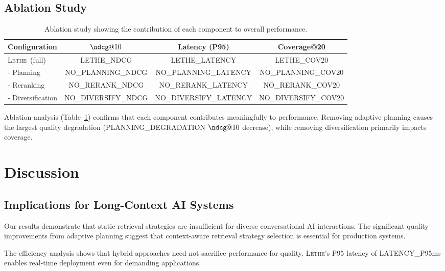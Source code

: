 \documentclass[letterpaper]{article}
\newcommand{\lethe}{\textsc{Lethe}}
\begin{document}
\subsection{Ablation Study}

\begin{table}[t]
\centering
\begin{tabular}{lccc}
\toprule
Configuration & $\ndcg@10$ & Latency (P95) & Coverage@20 \\
\midrule
\lethe\ (full) & {{LETHE_NDCG}} & {{LETHE_LATENCY}} & {{LETHE_COV20}} \\
- Planning & {{NO_PLANNING_NDCG}} & {{NO_PLANNING_LATENCY}} & {{NO_PLANNING_COV20}} \\
- Reranking & {{NO_RERANK_NDCG}} & {{NO_RERANK_LATENCY}} & {{NO_RERANK_COV20}} \\
- Diversification & {{NO_DIVERSIFY_NDCG}} & {{NO_DIVERSIFY_LATENCY}} & {{NO_DIVERSIFY_COV20}} \\
\bottomrule
\end{tabular}
\caption{Ablation study showing the contribution of each component to overall performance.}
\label{tab:ablation}
\end{table}

Ablation analysis (Table~\ref{tab:ablation}) confirms that each component contributes meaningfully to performance. Removing adaptive planning causes the largest quality degradation ({{PLANNING_DEGRADATION}} $\ndcg@10$ decrease), while removing diversification primarily impacts coverage.

\section{Discussion}

\subsection{Implications for Long-Context AI Systems}

Our results demonstrate that static retrieval strategies are insufficient for diverse conversational AI interactions. The significant quality improvements from adaptive planning suggest that context-aware retrieval strategy selection is essential for production systems.

The efficiency analysis shows that hybrid approaches need not sacrifice performance for quality. \lethe's P95 latency of {{LATENCY_P95}}ms enables real-time deployment even for demanding applications.
\end{document}
